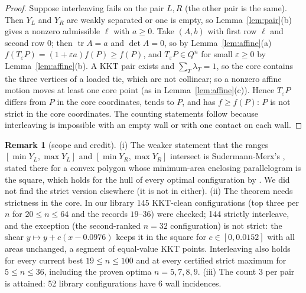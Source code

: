 \documentclass[11pt]{amsart}
\theoremstyle{definition}
\newtheorem{remark}[theorem]{Remark}
\newcommand{\tr}{\operatorname{tr}}
\begin{document}
\begin{proof}
Suppose interleaving fails on the pair $L,R$ (the other pair is the same). Then $Y_L$ and $Y_R$ are weakly separated or one is empty, so Lemma~\ref{lem:pair}(b) gives a nonzero admissible $\ell$ with $a \ge 0$. Take $(A,b)$ with first row $\ell$ and second row $0$; then $\tr A = a$ and $\det A = 0$, so by Lemma~\ref{lem:affine}(a) $f(T_\varepsilon P) = (1+\varepsilon a) f(P) \ge f(P)$, and $T_\varepsilon P \in Q^n$ for small $\varepsilon \ge 0$ by Lemma~\ref{lem:affine}(b). A KKT pair exists \cite{Trela} and $\sum_T\lambda_T = 1$, so the core contains the three vertices of a loaded tie, which are not collinear; so a nonzero affine motion moves at least one core point (as in Lemma~\ref{lem:affine}(c)). Hence $T_\varepsilon P$ differs from $P$ in the core coordinates, tends to $P$, and has $f \ge f(P)$: $P$ is not strict in the core coordinates. The counting statements follow because interleaving is impossible with an empty wall or with one contact on each wall.
\end{proof}

\begin{remark}[scope and credit]
(i) The weaker statement that the ranges $[\min Y_L,\max Y_L]$ and $[\min Y_R,\max Y_R]$ intersect is Sudermann-Merx's \cite[Lemma~2(C)]{SM}, stated there for a convex polygon whose minimum-area enclosing parallelogram is the square, which holds for the hull of every optimal configuration by \cite[Lemma~1]{SM}. We did not find the strict version elsewhere (it is not in \cite{Trela} either). %
(ii) The theorem needs strictness in the core. In our library 145 KKT-clean configurations (top three per $n$ for $20 \le n \le 64$ and the records $19$--$36$) were checked; 144 strictly interleave, and the exception (the second-ranked $n = 32$ configuration) is not strict: the shear $y \mapsto y + c(x - 0.0976)$ keeps it in the square for $c \in [0, 0.0152]$ with all areas unchanged, a segment of equal-value KKT points. %
Interleaving also holds for every current best $19 \le n \le 100$ and at every certified strict maximum for $5 \le n \le 36$, including the proven optima $n = 5, 7, 8, 9$. %
(iii) The count $3$ per pair is attained: 52 library configurations have 6 wall incidences. %
\end{remark}
\end{document}
